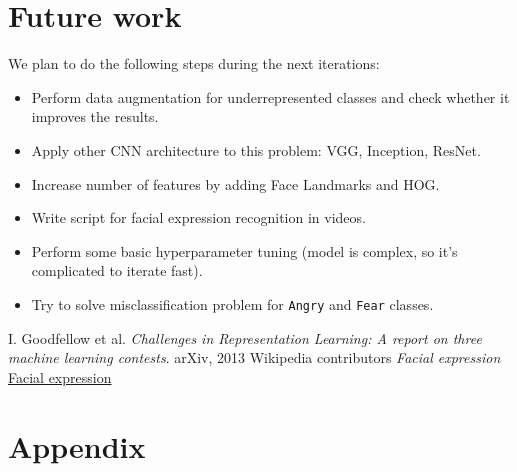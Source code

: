 \section{Future work}

We plan to do the following steps during the next iterations:

\begin{itemize}
	\item 
	Perform data augmentation for underrepresented classes and check whether it improves the results.
	\item 
	Apply other CNN architecture to this problem: VGG, Inception, ResNet.
	\item 
	Increase number of features by adding Face Landmarks and HOG.
	\item 
	Write script for facial expression recognition in videos.
	\item 
	Perform some basic hyperparameter tuning (model is complex, so it's complicated to iterate fast).
	\item 
	Try to solve misclassification problem for \texttt{Angry} and \texttt{Fear} classes.
\end{itemize}


\newpage
\begin{thebibliography}{6}
	I. Goodfellow et al.
	\textit{Challenges in Representation Learning: A report on three machine learning
		contests}. 
	arXiv, 2013
	Wikipedia contributors
	\textit{Facial expression}
	\href{https://en.wikipedia.org/wiki/Facial_expression}{Facial expression}
	


\end{thebibliography}

\newpage
\appendix
\section{Appendix}


